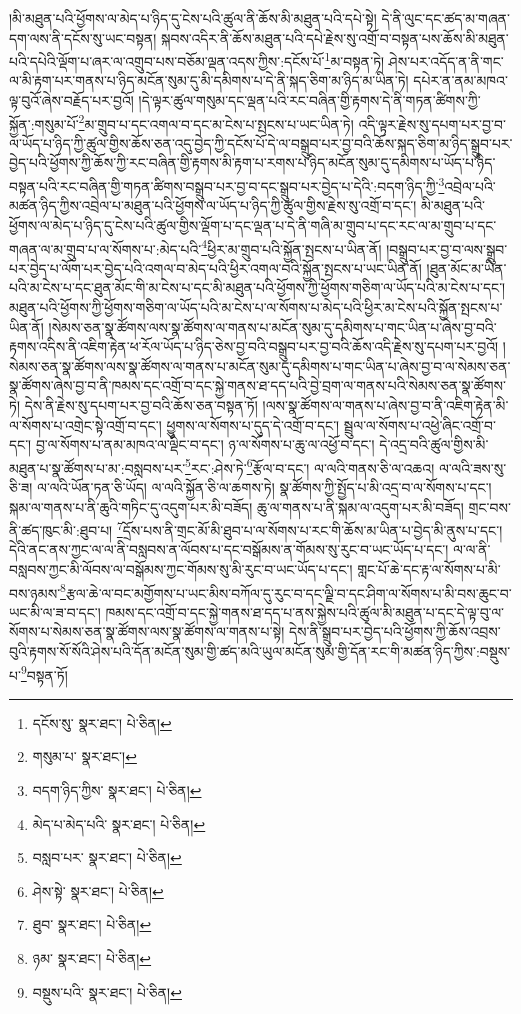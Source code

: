 །མི་མཐུན་པའི་ཕྱོགས་ལ་མེད་པ་ཉིད་དུ་ངེས་པའི་ཚུལ་ནི་ཆོས་མི་མཐུན་པའི་དཔེ་སྟེ། དེ་ནི་ལུང་དང་ཚད་མ་གཞན་དག་ལས་ནི་དངོས་སུ་ཡང་བསྟན། སྐབས་འདིར་ནི་ཆོས་མཐུན་པའི་དཔེ་རྗེས་སུ་འགྲོ་བ་བསྟན་པས་ཆོས་མི་མཐུན་པའི་དཔེའི་ལྡོག་པ་ཞར་ལ་འགྲུབ་པས་བཅོམ་ལྡན་འདས་ཀྱིས་:དངོས་པོ་\footnote{དངོས་སུ་  སྣར་ཐང་།  པེ་ཅིན། }མ་བསྟན་ཏེ། ཤེས་པར་འདོད་ན་ནི་གང་ལ་མི་རྟག་པར་གནས་པ་ཉིད་མངོན་སུམ་དུ་མི་དམིགས་པ་དེ་ནི་སྐད་ཅིག་མ་ཉིད་མ་ཡིན་ཏེ། དཔེར་ན་ནམ་མཁའ་ལྟ་བུའོ་ཞེས་བརྗོད་པར་བྱའོ། །དེ་ལྟར་ཚུལ་གསུམ་དང་ལྡན་པའི་རང་བཞིན་གྱི་རྟགས་དེ་ནི་གཏན་ཚིགས་ཀྱི་སྐྱོན་:གསུམ་པོ་\footnote{གསུམ་པ་  སྣར་ཐང་། }མ་གྲུབ་པ་དང་འགལ་བ་དང་མ་ངེས་པ་སྤངས་པ་ཡང་ཡིན་ཏེ། འདི་ལྟར་རྗེས་སུ་དཔག་པར་བྱ་བ་ལ་ཡོད་པ་ཉིད་ཀྱི་ཚུལ་གྱིས་ཆོས་ཅན་འདུ་བྱེད་ཀྱི་དངོས་པོ་དེ་ལ་བསྒྲུབ་པར་བྱ་བའི་ཆོས་སྐད་ཅིག་མ་ཉིད་སྒྲུབ་པར་བྱེད་པའི་ཕྱོགས་ཀྱི་ཆོས་ཀྱི་རང་བཞིན་གྱི་རྟགས་མི་རྟག་པ་རགས་པ་ཉིད་མངོན་སུམ་དུ་དམིགས་པ་ཡོད་པ་ཉིད་བསྟན་པའི་རང་བཞིན་གྱི་གཏན་ཚིགས་བསྒྲུབ་པར་བྱ་བ་དང་སྒྲུབ་པར་བྱེད་པ་དེའི་:བདག་ཉིད་ཀྱི་\footnote{བདག་ཉིད་ཀྱིས་  སྣར་ཐང་།  པེ་ཅིན། }འབྲེལ་པའི་མཚན་ཉིད་ཀྱིས་འབྲེལ་པ་མཐུན་པའི་ཕྱོགས་ལ་ཡོད་པ་ཉིད་ཀྱི་ཚུལ་གྱིས་རྗེས་སུ་འགྲོ་བ་དང་། མི་མཐུན་པའི་ཕྱོགས་ལ་མེད་པ་ཉིད་དུ་ངེས་པའི་ཚུལ་གྱིས་ལྡོག་པ་དང་ལྡན་པ་དེ་ནི་གཞི་མ་གྲུབ་པ་དང་རང་ལ་མ་གྲུབ་པ་དང་གཞན་ལ་མ་གྲུབ་པ་ལ་སོགས་པ་:མེད་པའི་\footnote{མེད་པ་མེད་པའི་  སྣར་ཐང་།  པེ་ཅིན། }ཕྱིར་མ་གྲུབ་པའི་སྐྱོན་སྤངས་པ་ཡིན་ནོ། །བསྒྲུབ་པར་བྱ་བ་ལས་སྒྲུབ་པར་བྱེད་པ་ལོག་པར་བྱེད་པའི་འགལ་བ་མེད་པའི་ཕྱིར་འགལ་བའི་སྐྱོན་སྤངས་པ་ཡང་ཡིན་ནོ། །ཐུན་མོང་མ་ཡིན་པའི་མ་ངེས་པ་དང་ཐུན་མོང་གི་མ་ངེས་པ་དང་མི་མཐུན་པའི་ཕྱོགས་ཀྱི་ཕྱོགས་གཅིག་ལ་ཡོད་པའི་མ་ངེས་པ་དང་། མཐུན་པའི་ཕྱོགས་ཀྱི་ཕྱོགས་གཅིག་ལ་ཡོད་པའི་མ་ངེས་པ་ལ་སོགས་པ་མེད་པའི་ཕྱིར་མ་ངེས་པའི་སྐྱོན་སྤངས་པ་ཡིན་ནོ། །སེམས་ཅན་སྣ་ཚོགས་ལས་སྣ་ཚོགས་ལ་གནས་པ་མངོན་སུམ་དུ་དམིགས་པ་གང་ཡིན་པ་ཞེས་བྱ་བའི་རྟགས་འདིས་ནི་འཇིག་རྟེན་ཕ་རོལ་ཡོད་པ་ཉིད་ཅེས་བྱ་བའི་བསྒྲུབ་པར་བྱ་བའི་ཆོས་འདི་རྗེས་སུ་དཔག་པར་བྱའོ། །སེམས་ཅན་སྣ་ཚོགས་ལས་སྣ་ཚོགས་ལ་གནས་པ་མངོན་སུམ་དུ་དམིགས་པ་གང་ཡིན་པ་ཞེས་བྱ་བ་ལ་སེམས་ཅན་སྣ་ཚོགས་ཞེས་བྱ་བ་ནི་ཁམས་དང་འགྲོ་བ་དང་སྐྱེ་གནས་ཐ་དད་པའི་བྱེ་བྲག་ལ་གནས་པའི་སེམས་ཅན་སྣ་ཚོགས་ཏེ། དེས་ནི་རྗེས་སུ་དཔག་པར་བྱ་བའི་ཆོས་ཅན་བསྟན་ཏོ། །ལས་སྣ་ཚོགས་ལ་གནས་པ་ཞེས་བྱ་བ་ནི་འཇིག་རྟེན་མི་ལ་སོགས་པ་འགྲེང་སྟེ་འགྲོ་བ་དང་། ཕྱུགས་ལ་སོགས་པ་དུད་དེ་འགྲོ་བ་དང་། སྦྲུལ་ལ་སོགས་པ་འཕྱེ་ཞིང་འགྲོ་བ་དང་། བྱ་ལ་སོགས་པ་ནམ་མཁའ་ལ་ལྡིང་བ་དང་། ཉ་ལ་སོགས་པ་ཆུ་ལ་འཕྱོ་བ་དང་། དེ་འདྲ་བའི་ཚུལ་གྱིས་མི་མཐུན་པ་སྣ་ཚོགས་པ་མ་:བསླབས་པར་\footnote{བསླབ་པར་  སྣར་ཐང་།  པེ་ཅིན། }རང་:ཤེས་ཏེ་\footnote{ཤེས་སྟེ་  སྣར་ཐང་།  པེ་ཅིན། }རྩོལ་བ་དང་། ལ་ལའི་གནས་ཅི་ལ་འཆའ། ལ་ལའི་ཟས་སུ་ཅི་ཟ། ལ་ལའི་ཡོན་ཏན་ཅི་ཡོད། ལ་ལའི་སྐྱོན་ཅི་ལ་ཆགས་ཏེ། སྣ་ཚོགས་ཀྱི་སྤྱོད་པ་མི་འདྲ་བ་ལ་སོགས་པ་དང་། སྐམ་ལ་གནས་པ་ནི་ཆུའི་གཏིང་དུ་འདུག་པར་མི་བཟོད། ཆུ་ལ་གནས་པ་ནི་སྐམ་ལ་འདུག་པར་མི་བཟོད། གྲང་བས་ནི་ཚད་ཁུང་མི་:ཐུབ་པ། \footnote{ཐུབ་  སྣར་ཐང་།  པེ་ཅིན། }དྲོས་པས་ནི་གྲང་མོ་མི་ཐུབ་པ་ལ་སོགས་པ་རང་གི་ཆོས་མ་ཡིན་པ་བྱེད་མི་ནུས་པ་དང་། དེའི་ནང་ནས་ཀྱང་ལ་ལ་ནི་བསླབས་ན་ལོབས་པ་དང་བསྒོམས་ན་གོམས་སུ་རུང་བ་ཡང་ཡོད་པ་དང་། ལ་ལ་ནི་བསླབས་ཀྱང་མི་ལོབས་ལ་བསྒོམས་ཀྱང་གོམས་སུ་མི་རུང་བ་ཡང་ཡོད་པ་དང་། གླང་པོ་ཆེ་དང་རྟ་ལ་སོགས་པ་མི་བས་ཉམས་\footnote{ཉམ་  སྣར་ཐང་།  པེ་ཅིན། }རྩལ་ཆེ་ལ་བང་མགྱོགས་པ་ཡང་མིས་བཀོལ་དུ་རུང་བ་དང་ལྗི་བ་དང་ཤིག་ལ་སོགས་པ་མི་བས་ཆུང་བ་ཡང་མི་ལ་ཟ་བ་དང་། ཁམས་དང་འགྲོ་བ་དང་སྐྱེ་གནས་ཐ་དད་པ་ནས་སྐྱེས་པའི་ཚུལ་མི་མཐུན་པ་དང་དེ་ལྟ་བུ་ལ་སོགས་པ་སེམས་ཅན་སྣ་ཚོགས་ལས་སྣ་ཚོགས་ལ་གནས་པ་སྟེ། དེས་ནི་སྒྲུབ་པར་བྱེད་པའི་ཕྱོགས་ཀྱི་ཆོས་འབྲས་བུའི་རྟགས་སོ་སོའི་ཤེས་པའི་དོན་མངོན་སུམ་གྱི་ཚད་མའི་ཡུལ་མངོན་སུམ་གྱི་དོན་རང་གི་མཚན་ཉིད་ཀྱིས་:བསྡུས་པ་\footnote{བསྡུས་པའི་  སྣར་ཐང་།  པེ་ཅིན། }བསྟན་ཏོ། 
